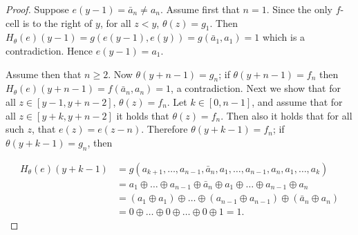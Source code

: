 \documentclass[runningheads]{llncs}
\begin{document}
\begin{proof}
Suppose $e(y-1) = \bar a_n \neq a_n$. Assume first that $n=1$. Since the only $f$-cell is to the right of $y$, for all $z<y$, $\theta (z) = g_1$. Then $H_\theta (e) (y-1) = g(e(y-1),e(y)) = g(\bar a_1,a_1) = 1$ which is a contradiction. Hence $e(y-1) = a_1$.

Assume then that $n\geq 2$. Now $\theta(y+n-1) = g_n$; if $\theta(y+n-1) = f_n$ then $H_\theta (e)(y+n-1) = f(\bar a_n, a_n) = 1$, a contradiction. Next we show that for all $z \in [y-1, y+n-2]$,  $\theta(z) = f_n$. Let $k\in [0,n-1]$, and assume that for all $z \in [y+k, y+n-2]$ it holds that $\theta (z) = f_n$. Then also it holds that for all such $z$, that $e(z) = e(z-n)$. Therefore $\theta(y+k-1) = f_n$; if $\theta (y+k-1) = g_n$, then

\begin{align*}
H_\theta (e) (y+k-1) &= 
g(a_{k+1},\ldots, a_{n-1}, \bar a_n, a_1, \ldots, a_{n-1}, a_n, a_1, \ldots, a_{k})
\\
&= a_1\oplus \ldots \oplus a_{n-1} \oplus \bar a_n \oplus a_1 \oplus \ldots \oplus a_{n-1} \oplus a_n
\\
&= (a_1 \oplus a_1) \oplus \ldots  \oplus (a_{n-1} \oplus a_{n-1}) \oplus (\bar a_n \oplus a_n)
\\
&= 0 \oplus \ldots \oplus 0 \oplus \ldots \oplus 0 \oplus 1 = 1.
\end{align*}



\end{proof}
\end{document}
